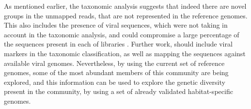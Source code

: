 As mentioned earlier, the taxonomic analysis suggests that indeed there are novel groups in the unmapped reads, that are not represented in the reference genomes. This also includes the presence of viral sequences, which were not taking in account in the taxonomic analysis, and could compromise a large percentage of the sequences present in each of libraries \cite{RodriguezBrito:2010in,Emerson:tk}. Further work, should include viral markers in the taxonomic classification, as well as mapping the sequences against available viral genomes. Nevertheless, by using the current set of reference genomes, some of the most abundant members of this community are being explored, and this information can be used to explore the genetic diversity present in the community, by using a set of already validated habitat-specific genomes.

